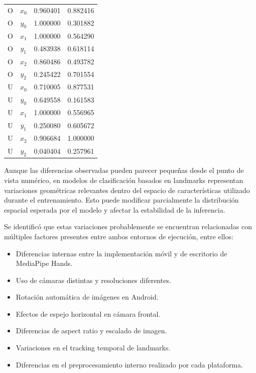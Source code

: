 {\begin{table}[H]
{\begin{tabular}{
						!{\vrule width 0.4pt}
						c
						!{\vrule width 0.4pt}
						c
						!{\vrule width 0.4pt}
						c
						!{\vrule width 0.4pt}
						c
						!{\vrule width 0.4pt}
					}
					O & $x_0$ & 0.960401 & 0.882416 \\
					O & $y_0$ & 1.000000 & 0.301882 \\
					O & $x_1$ & 1.000000 & 0.564290 \\
					O & $y_1$ & 0.483938 & 0.618114 \\
					O & $x_2$ & 0.860486 & 0.493782 \\
					O & $y_2$ & 0.245422 & 0.701554 \\
					\hline
					
					U & $x_0$ & 0.710005 & 0.877531 \\
					U & $y_0$ & 0.649558 & 0.161583 \\
					U & $x_1$ & 1.000000 & 0.556965 \\
					U & $y_1$ & 0.250080 & 0.605672 \\
					U & $x_2$ & 0.906684 & 1.000000 \\
					U & $y_2$ & 0.040404 & 0.257961 \\
					\hline
					
				\end{tabular}
				
			}
		\end{table}
	}
	
	
	Aunque las diferencias observadas pueden parecer pequeñas desde el punto de vista numérico, en modelos de clasificación basados en landmarks representan variaciones geométricas relevantes dentro del espacio de características utilizado durante el entrenamiento. Esto puede modificar parcialmente la distribución espacial esperada por el modelo y afectar la estabilidad de la inferencia.
	
	Se identificó que estas variaciones probablemente se encuentran relacionadas con múltiples factores presentes entre ambos entornos de ejecución, entre ellos:
	
	\begin{itemize}
		\item Diferencias internas entre la implementación móvil y de escritorio de MediaPipe Hands.
		\item Uso de cámaras distintas y resoluciones diferentes.
		\item Rotación automática de imágenes en Android.
		\item Efectos de espejo horizontal en cámara frontal.
		\item Diferencias de aspect ratio y escalado de imagen.
		\item Variaciones en el tracking temporal de landmarks.
		\item Diferencias en el preprocesamiento interno realizado por cada plataforma.
	\end{itemize}
	
